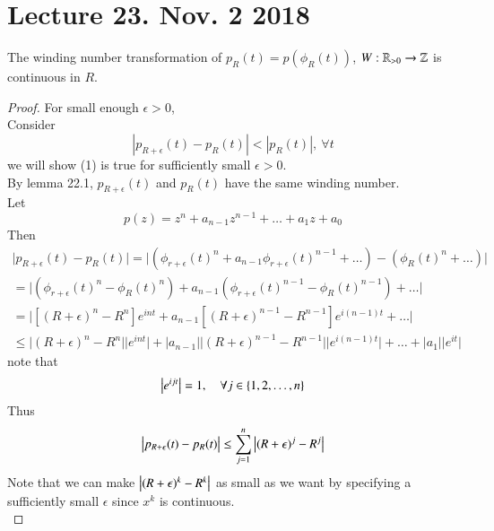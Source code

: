 \documentclass[10pt]{article}
\begin{document}
	\section{Lecture 23. Nov. 2 2018}
		\begin{proposition}
			The winding number transformation of $p_R(t) = p(\phi_R(t))$, $W: \mathbb{R}_{> 0} \to \mathbb{Z}$ is continuous in $R$.
		\end{proposition}
		\begin{proof}
			For small enough $\epsilon > 0$, \\
			Consider 
			\begin{equation}
				|p_{R + \epsilon}(t) - p_R(t)| < |p_R(t)|,\ \forall t
			\end{equation}
			we will show (1) is true for sufficiently small $\epsilon > 0$. \\
			By lemma 22.1, $p_{R+\epsilon}(t)$ and $p_R(t)$ have the same winding number. \\
			Let 
			\begin{equation}
				p(z) = z^n + a_{n-1}z^{n-1} + \dots + a_1 z + a_0
			\end{equation}
			Then 
			\begin{gather}
				\big| p_{R+\epsilon}(t) - p_R(t) \big| = \big| (\phi_{r+\epsilon}(t)^n + a_{n-1}\phi_{r+\epsilon}(t)^{n-1} + \dots) - (\phi_{R}(t)^n + \dots) \big| \\
				= \big| (\phi_{r+\epsilon}(t)^n - \phi_R(t)^n) + a_{n-1}(\phi_{r+\epsilon}(t)^{n-1} - \phi_R(t)^{n-1}) + \dots \big| \\
				= \big| [(R+\epsilon)^n - R^n] e^{int} + a_{n-1} [(R+\epsilon)^{n-1} - R^{n-1}] e^{i(n-1)t} + \dots \big| \\
				\leq \big| (R+\epsilon)^n - R^n \big | \big |e^{int} \big| + \big| a_{n-1} \big| \big | (R+\epsilon)^{n-1} - R^{n-1} \big | \big | e^{i(n-1)t} \big | + \dots + \big |a_1 \big| \big |e^{it} \big |
			\end{gather}
			note that
			\begin{equation}
				\big \vert {e^{ijt}} \big \vert = 1,\quad \forall j \in \{1, 2, \dots, n\}
			\end{equation}
			Thus
			\begin{gather}
				\big \vert {p_{R+\epsilon}(t) - p_R(t)} \big \vert \leq \sum_{j=1}^n \big \vert {(R + \epsilon)^j - R^j} \big \vert
			\end{gather}
			Note that we can make $\big \vert {(R+\epsilon)^k - R^k} \big \vert$ as small as we want by specifying a sufficiently small $\epsilon$ since $x^k$ is continuous. \\
		\end{proof}
		
\end{document}
